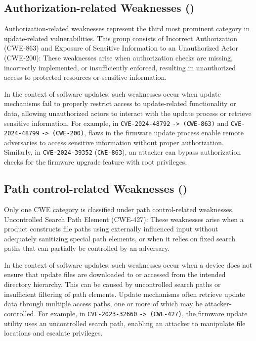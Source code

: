 \documentclass[fleqn,s1,names,tex]{neptune}
\begin{document}
\subsection{Authorization-related \?Weaknesses ()}


Authorization-related weaknesses represent the third most prominent category in update-related vulnerabilities. 
This group consists of 
Incorrect Authorization (CWE-863) and 
Exposure of Sensitive Information to an Unauthorized Actor (CWE-200):
These weaknesses arise when authorization checks are missing, incorrectly implemented, or insufficiently enforced, resulting in unauthorized access to protected resources or sensitive information.


In the context of software updates, such weaknesses occur when update mechanisms fail to properly restrict access to update-related functionality or data, allowing unauthorized actors to interact with the update process or retrieve sensitive information. 
For example, in \texttt{CVE-2024-48792} \texttt{-> (CWE-863)} and \texttt{CVE-2024-48799} \texttt{-> (CWE-200)}, flaws in the firmware update process enable remote adversaries to access sensitive information without proper authorization. 
Similarly, in \texttt{CVE-2024-39352} (\texttt{CWE-863}), an attacker can bypass authorization checks for the firmware upgrade feature with root privileges.


\subsection{Path control-related \?Weaknesses ({})}
  
Only one CWE category is classified under path control-related weaknesses. 
Uncontrolled Search Path Element (CWE-427):
These weaknesses arise when a product constructs file paths using externally influenced input without adequately sanitizing special path elements, or when it relies on fixed search paths that can partially be controlled by an adversary. 

In the context of software updates, such weaknesses occur when a device does not ensure that update files are downloaded to or accessed from the intended directory hierarchy. 
This can be caused by uncontrolled search paths or insufficient filtering of path elements. 
Update mechanisms often retrieve update data through multiple access paths, one or more of which may be attacker-controlled. For example, in \texttt{CVE-2023-32660}  \texttt{-> (CWE-427)}, the firmware update utility uses an uncontrolled search path, enabling an attacker to manipulate file locations and escalate privileges.
\end{document}
